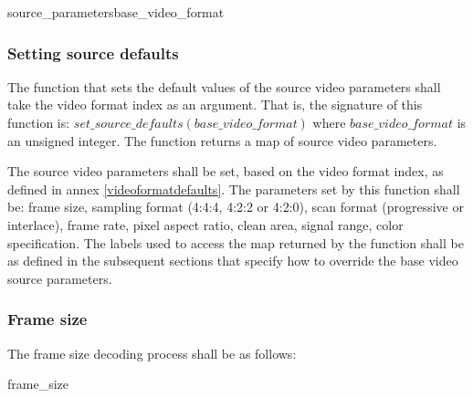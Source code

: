 \begin{pseudo}{source\_parameters}{base\_video\_format}
\bsRET{\VideoParams}
\end{pseudo}

\subsubsection{Setting source defaults}
\label{setsourcedefaults}

The function that sets the default values of the source video parameters 
shall take the video format index as an argument. That is, the signature of this 
function is: $set\_source\_defaults(base\_video\_format)$ where 
$base\_video\_format$ is an unsigned integer. The function returns a map 
of source video parameters.

The source video parameters shall be set, based on the video format index, 
as defined in annex \ref{videoformatdefaults}. The parameters set by this 
function shall be: frame size, sampling format (4:4:4, 4:2:2 or 4:2:0), 
scan format (progressive or interlace), frame rate, pixel aspect ratio, 
clean area, signal range, color specification. The labels used to access the 
map returned by the function shall be as defined in the
subsequent sections that specify how to override the base video source 
parameters.

\subsubsection{Frame size}
\label{framedimensions}

The frame size decoding process shall be as follows:

\begin{pseudo}{frame\_size}{\VideoParams}
\bsEND
\end{pseudo}

